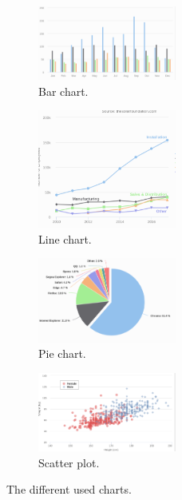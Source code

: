 \begin{figure}[h!]
  \begin{subfigure}{.50\textwidth}
      \center
      \includegraphics[width=0.50\textwidth]{images/chapter3/chartexmple/bar.PNG}
      \caption{Bar chart.}
  \end{subfigure}
  \begin{subfigure}{.50\textwidth}
      \center
      \includegraphics[width=0.50\textwidth]{images/chapter3/chartexmple/line.PNG}
      \caption{Line chart.}
  \end{subfigure}
  \begin{subfigure}{.50\textwidth}
      \center
      \includegraphics[width=0.50\textwidth]{images/chapter3/chartexmple/pie.PNG}
      \caption{Pie chart.}
  \end{subfigure}
  \begin{subfigure}{.50\textwidth}
      \center
      \includegraphics[width=0.50\textwidth]{images/chapter3/chartexmple/scatter.PNG}
      \caption{Scatter plot.}
  \end{subfigure}
  \caption{The different used charts.}
\end{figure}
\newpage
